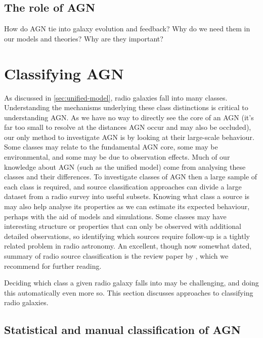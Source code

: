    \subsection{The role of AGN}
    \label{sec:role-of-agn}

        How do AGN tie into galaxy evolution and feedback? Why do we need them in our models and theories? Why are they important? \todo{}

\section{Classifying AGN}
\label{sec:classification-of-agn}

    As discussed in \autoref{sec:unified-model}, radio galaxies fall into many classes. Understanding the mechanisms underlying these class distinctions is critical to understanding AGN. As we have no way to directly see the core of an AGN (it's far too small to resolve at the distances AGN occur and may also be occluded), our only method to investigate AGN is by looking at their large-scale behaviour. Some classes may relate to the fundamental AGN core, some may be environmental, and some may be due to observation effects. Much of our knowledge about AGN (such as the unified model) come from analysing these classes and their differences. To investigate classes of AGN then a large sample of each class is required, and source classification approaches can divide a large dataset from a radio survey into useful subsets. Knowing what class a source is may also help analyse its properties as we can estimate its expected behaviour, perhaps with the aid of models and simulations. Some classes may have interesting structure or properties that can only be observed with additional detailed observations, so identifying which sources require follow-up is a tightly related problem in radio astronomy. An excellent, though now somewhat dated, summary of radio source classification is the review paper by \citet{urry_unified_1995}, which we recommend for further reading.

    Deciding which class a given radio galaxy falls into may be challenging, and doing this automatically even more so. This section discusses approaches to classifying radio galaxies.

    \subsection{Statistical and manual classification of AGN}
    \label{sec:manual-classification}

